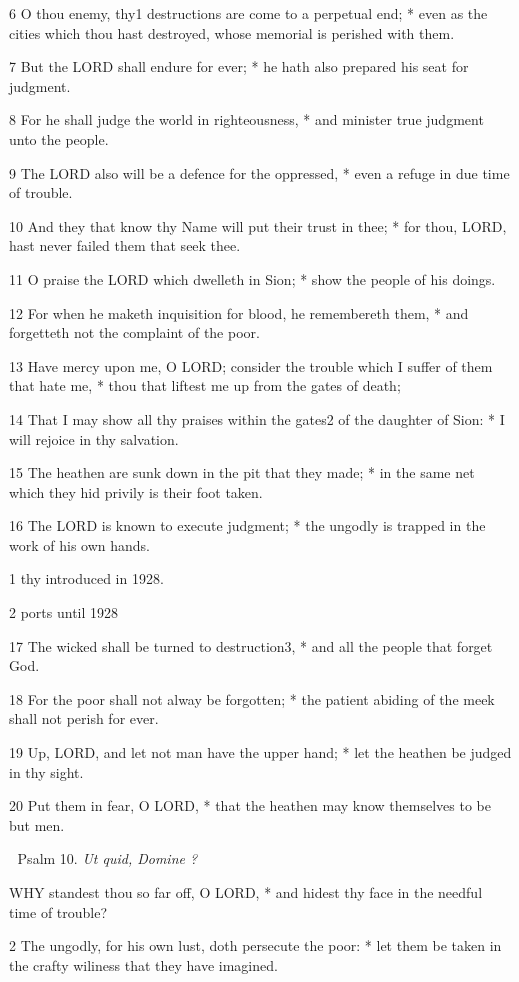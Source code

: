 6 O thou enemy, thy1 destructions are come to a perpetual
end; * even as the cities which thou hast destroyed, whose memorial is perished
with them.

7 But the LORD shall endure for
ever; * he hath also prepared his seat for judgment.

8 For he shall judge the world in righteousness, * and
minister true judgment unto the people.

9 The LORD also will be a defence
for the oppressed, * even a refuge in due time of trouble.

10 And they that know thy Name will put their trust in
thee; * for thou, LORD, hast never failed them that
seek thee.

11 O praise the LORD which dwelleth
in Sion; * show the people of his doings.

12 For when he maketh inquisition for blood, he remembereth
them, * and forgetteth not the complaint of the poor.

13 Have mercy upon me, O LORD;
consider the trouble which I suffer of them that hate me, * thou that liftest
me up from the gates of death;

14 That I may show all thy praises within the gates2
of the daughter of Sion: * I will rejoice in thy salvation.

15 The heathen are sunk down in the pit that they made;
* in the same net which they hid privily is their foot taken.

16 The LORD is known to execute
judgment; * the ungodly is trapped in the work of his own hands.

1 thy
introduced in 1928.

2 ports until
1928

17 The wicked shall be turned to destruction3,
* and all the people that forget God.

18 For the poor shall not alway be forgotten; * the patient
abiding of the meek shall not perish for ever.

19 Up, LORD, and let not man have
the upper hand; * let the heathen be judged in thy sight.

20 Put them in fear, O LORD, *
that the heathen may know themselves to be but men.


Psalm 10. \emph{Ut quid,
Domine ?}

WHY
standest thou so far off, O LORD, * and hidest
thy face in the needful time of trouble?

2 The ungodly, for his own lust, doth persecute the
poor: * let them be taken in the crafty wiliness that they have imagined.

